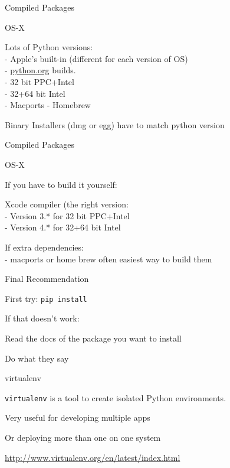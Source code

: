 \documentclass{beamer}
\begin{document}
\begin{frame}[fragile]{Compiled Packages}

{\LARGE OS-X}

\vfill
{\Large Lots of Python versions:\\[0.1in]
  - Apple's built-in (different for each version of OS)\\[0.1in]
  - \url{python.org} builds.\\
  \hspace{0.5in}- 32 bit PPC+Intel\\
  \hspace{0.5in}- 32+64 bit Intel\\[0.1in]
  - Macports
  - Homebrew
}


\vfill
{\Large Binary Installers (dmg or egg) have to match python version}

\end{frame} 

\begin{frame}[fragile]{Compiled Packages}

{\LARGE OS-X}

\vfill
{\Large If you have to build it yourself:}

\vfill
{\Large Xcode compiler (the right version:\\[0.1in]
  - Version 3.* for 32 bit PPC+Intel\\[0.1in]
  - Version 4.* for 32+64 bit Intel\\
}

\vfill
{\Large If extra dependencies:\\[0.1in]
  - macports or home brew often easiest way to build them
}

\end{frame} 

\begin{frame}[fragile]{Final Recommendation}

{\Large First try: \verb|pip install|}

\vfill
{\Large If that doesn't work:}

\vfill
{\Large Read the docs of the package you want to install}

\vfill
{\Large Do what they say}

\end{frame} 

\begin{frame}[fragile]{virtualenv}

{\Large \verb|virtualenv| is a tool to create isolated Python environments.}

\vfill
{\Large Very useful for developing multiple apps}

\vfill
{\Large Or deploying more than one on one system}

\vfill
\url{http://www.virtualenv.org/en/latest/index.html}
\end{frame} 
\end{document}
